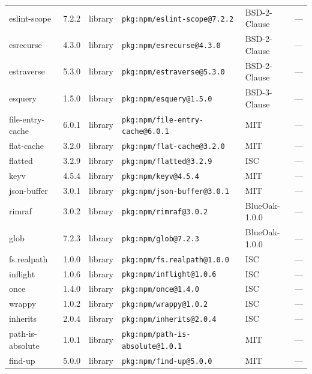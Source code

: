 \documentclass[11pt,a4paper]{article}
\begin{document}
\begin{longtable}{|p{4cm}|p{2cm}|p{1.6cm}|p{5cm}|p{1.5cm}|p{3.5cm}|}
\raggedright eslint-scope & 7.2.2 & library & \small\texttt{pkg:npm/eslint-scope@7.2.2} & BSD-2-Clause & \small — \\
\raggedright esrecurse & 4.3.0 & library & \small\texttt{pkg:npm/esrecurse@4.3.0} & BSD-2-Clause & \small — \\
\raggedright estraverse & 5.3.0 & library & \small\texttt{pkg:npm/estraverse@5.3.0} & BSD-2-Clause & \small — \\
\raggedright esquery & 1.5.0 & library & \small\texttt{pkg:npm/esquery@1.5.0} & BSD-3-Clause & \small — \\
\raggedright file-entry-cache & 6.0.1 & library & \small\texttt{pkg:npm/file-entry-cache@6.0.1} & MIT & \small — \\
\raggedright flat-cache & 3.2.0 & library & \small\texttt{pkg:npm/flat-cache@3.2.0} & MIT & \small — \\
\raggedright flatted & 3.2.9 & library & \small\texttt{pkg:npm/flatted@3.2.9} & ISC & \small — \\
\raggedright keyv & 4.5.4 & library & \small\texttt{pkg:npm/keyv@4.5.4} & MIT & \small — \\
\raggedright json-buffer & 3.0.1 & library & \small\texttt{pkg:npm/json-buffer@3.0.1} & MIT & \small — \\
\raggedright rimraf & 3.0.2 & library & \small\texttt{pkg:npm/rimraf@3.0.2} & BlueOak-1.0.0 & \small — \\
\raggedright glob & 7.2.3 & library & \small\texttt{pkg:npm/glob@7.2.3} & BlueOak-1.0.0 & \small — \\
\raggedright fs.realpath & 1.0.0 & library & \small\texttt{pkg:npm/fs.realpath@1.0.0} & ISC & \small — \\
\raggedright inflight & 1.0.6 & library & \small\texttt{pkg:npm/inflight@1.0.6} & ISC & \small — \\
\raggedright once & 1.4.0 & library & \small\texttt{pkg:npm/once@1.4.0} & ISC & \small — \\
\raggedright wrappy & 1.0.2 & library & \small\texttt{pkg:npm/wrappy@1.0.2} & ISC & \small — \\
\raggedright inherits & 2.0.4 & library & \small\texttt{pkg:npm/inherits@2.0.4} & ISC & \small — \\
\raggedright path-is-absolute & 1.0.1 & library & \small\texttt{pkg:npm/path-is-absolute@1.0.1} & MIT & \small — \\
\raggedright find-up & 5.0.0 & library & \small\texttt{pkg:npm/find-up@5.0.0} & MIT & \small — \\

\end{longtable}
\end{document}
